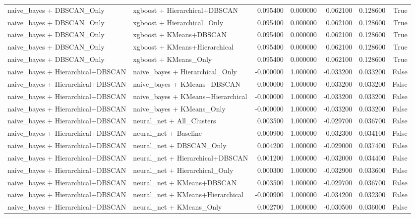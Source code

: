 \begin{tabular}{llrrrrr}
naive_bayes + DBSCAN_Only & xgboost + Hierarchical+DBSCAN & 0.095400 & 0.000000 & 0.062100 & 0.128600 & True \\
naive_bayes + DBSCAN_Only & xgboost + Hierarchical_Only & 0.095400 & 0.000000 & 0.062100 & 0.128600 & True \\
naive_bayes + DBSCAN_Only & xgboost + KMeans+DBSCAN & 0.095400 & 0.000000 & 0.062100 & 0.128600 & True \\
naive_bayes + DBSCAN_Only & xgboost + KMeans+Hierarchical & 0.095400 & 0.000000 & 0.062100 & 0.128600 & True \\
naive_bayes + DBSCAN_Only & xgboost + KMeans_Only & 0.095400 & 0.000000 & 0.062100 & 0.128600 & True \\
naive_bayes + Hierarchical+DBSCAN & naive_bayes + Hierarchical_Only & -0.000000 & 1.000000 & -0.033200 & 0.033200 & False \\
naive_bayes + Hierarchical+DBSCAN & naive_bayes + KMeans+DBSCAN & -0.000000 & 1.000000 & -0.033200 & 0.033200 & False \\
naive_bayes + Hierarchical+DBSCAN & naive_bayes + KMeans+Hierarchical & -0.000000 & 1.000000 & -0.033200 & 0.033200 & False \\
naive_bayes + Hierarchical+DBSCAN & naive_bayes + KMeans_Only & -0.000000 & 1.000000 & -0.033200 & 0.033200 & False \\
naive_bayes + Hierarchical+DBSCAN & neural_net + All_Clusters & 0.003500 & 1.000000 & -0.029700 & 0.036700 & False \\
naive_bayes + Hierarchical+DBSCAN & neural_net + Baseline & 0.000900 & 1.000000 & -0.032300 & 0.034100 & False \\
naive_bayes + Hierarchical+DBSCAN & neural_net + DBSCAN_Only & 0.004200 & 1.000000 & -0.029000 & 0.037400 & False \\
naive_bayes + Hierarchical+DBSCAN & neural_net + Hierarchical+DBSCAN & 0.001200 & 1.000000 & -0.032000 & 0.034400 & False \\
naive_bayes + Hierarchical+DBSCAN & neural_net + Hierarchical_Only & 0.000300 & 1.000000 & -0.032900 & 0.033600 & False \\
naive_bayes + Hierarchical+DBSCAN & neural_net + KMeans+DBSCAN & 0.003500 & 1.000000 & -0.029700 & 0.036700 & False \\
naive_bayes + Hierarchical+DBSCAN & neural_net + KMeans+Hierarchical & -0.000900 & 1.000000 & -0.034200 & 0.032300 & False \\
naive_bayes + Hierarchical+DBSCAN & neural_net + KMeans_Only & 0.002700 & 1.000000 & -0.030500 & 0.036000 & False \\

\end{tabular}
